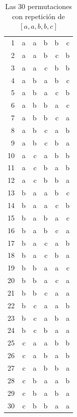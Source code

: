\begin{table}[ht]
\centering
\begin{tabular}{rrrrrr}
  \hline
1 & a & a & b & b & c \\
  2 & a & a & b & c & b \\
  3 & a & a & c & b & b \\
  4 & a & b & a & b & c \\
  5 & a & b & a & c & b \\
  6 & a & b & b & a & c \\
  7 & a & b & b & c & a \\
  8 & a & b & c & a & b \\
  9 & a & b & c & b & a \\
  10 & a & c & a & b & b \\
  11 & a & c & b & a & b \\
  12 & a & c & b & b & a \\
  13 & b & a & a & b & c \\
  14 & b & a & a & c & b \\
  15 & b & a & b & a & c \\
  16 & b & a & b & c & a \\
  17 & b & a & c & a & b \\
  18 & b & a & c & b & a \\
  19 & b & b & a & a & c \\
  20 & b & b & a & c & a \\
  21 & b & b & c & a & a \\
  22 & b & c & a & a & b \\
  23 & b & c & a & b & a \\
  24 & b & c & b & a & a \\
  25 & c & a & a & b & b \\
  26 & c & a & b & a & b \\
  27 & c & a & b & b & a \\
  28 & c & b & a & a & b \\
  29 & c & b & a & b & a \\
  30 & c & b & b & a & a \\
   \hline
\end{tabular}
\caption{Las 30 permutaciones con repetición de $[a,a,b,b,c]$}\label{cap03:tabla:permutacionesRepeticion}
\end{table}


